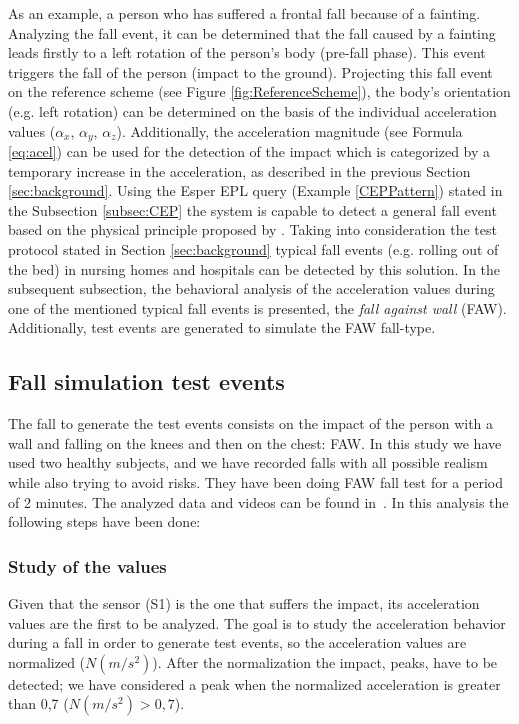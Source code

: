 \documentclass[10pt,journal,compsoc]{IEEEtran}
\begin{document}
As an example, a person who has suffered a frontal fall because of a fainting. Analyzing the fall event, it can be determined that the fall caused by a fainting leads firstly to a left rotation of the person's body (pre-fall phase). This event triggers the fall of the person (impact to the ground). Projecting this fall event on the reference scheme (see Figure \ref{fig:ReferenceScheme}), the body's orientation (e.g. left rotation) can be determined on the basis of the individual acceleration values ($\alpha_x$,  $\alpha_y$,  $\alpha_z$). Additionally, the acceleration magnitude (see Formula \ref{eq:acel}) can be used for the detection of the impact which is categorized by a temporary increase in the acceleration, as described in the previous Section \ref{sec:background}. Using the Esper EPL query (Example \ref{CEPPattern}) stated in the Subsection \ref{subsec:CEP} the system is capable to detect a general fall event based on the physical principle proposed by \cite{Kozina}.
Taking into consideration the test protocol stated in Section \ref{sec:background} typical fall events (e.g. rolling out of the bed) in nursing homes and hospitals can be detected by this solution. In the subsequent subsection, the behavioral analysis of the acceleration values during one of the mentioned typical fall events is presented, the \textit{fall against wall} (FAW). Additionally, test events are generated to simulate the FAW fall-type.

\subsection{Fall simulation test events}

The fall to generate the test events consists on the impact of the person with 
a wall and falling on the knees and then on the chest: FAW. 
In this study we have used two healthy subjects, and we have recorded falls with all 
possible realism while also trying to avoid risks. They have been doing FAW fall test for a period 
of 2 minutes. The analyzed data and videos can be found in~\cite{FallRepo}.
In this analysis the following steps have been done:

\subsubsection{Study of the values} Given that the sensor (S1) is the one that suffers the 
impact, its acceleration values are the first to be analyzed. The goal is to study 
the acceleration behavior during a fall in order to generate test events, so the acceleration 
values are normalized ($N(m/s^2)$). After the normalization the impact, peaks, 
have to be detected; we have considered a peak when the normalized acceleration is 
greater than 0,7 ($N(m/s^2) > 0,7$). 
\end{document}

